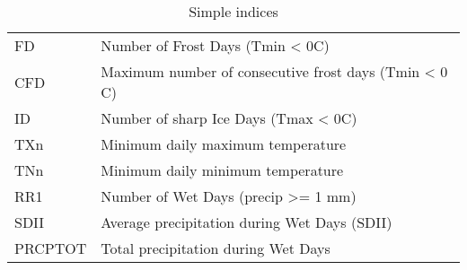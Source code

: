 \documentclass[a4paper,11pt]{article}
\begin{document}
\begin{table}[h]
\begin{tabular}{l p{10cm}}
    FD            &   Number of Frost Days (Tmin < 0C)                                                                               \\
    CFD           &   Maximum number of consecutive frost days (Tmin < 0 C)                                                          \\
    ID            &   Number of sharp Ice Days (Tmax < 0C)                                                                           \\
    TXn           &   Minimum daily maximum temperature                                                                              \\
    TNn           &   Minimum daily minimum temperature                                                                              \\
    RR1           &   Number of Wet Days (precip >= 1 mm)                                                                            \\
    SDII          &   Average precipitation during Wet Days (SDII)                                                                   \\
    PRCPTOT       &   Total precipitation during Wet Days                                                                            \\
    \end{tabular}
    \caption{Simple indices}
    \label{table/simple_indices}
    \end{table}
\end{document}

